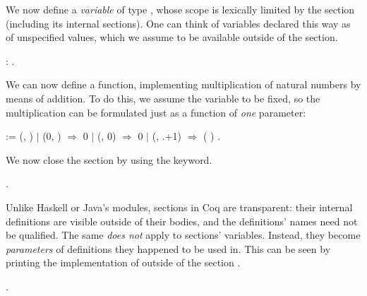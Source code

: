 We now define a \textit{variable}  of type , whose scope is lexically
limited by the section  (including its internal
sections). One can think of variables declared this way as of
unspecified values, which we assume to be available outside of the
section.


\begin{coqdoccode}
\coqdocemptyline
\coqdocnoindent
{} : .\coqdoceol
\coqdocemptyline
\end{coqdoccode}


We can now define a function, implementing multiplication of natural
numbers by means of addition. To do this, we assume the variable 
to be fixed, so the multiplication can be formulated just as a
function of \textit{one} parameter:


\begin{coqdoccode}
\coqdocemptyline
\coqdocnoindent
{}   :=  (, ) \coqdoceol
\coqdocindent{0.50em}
\ensuremath{|} (0, \coqdocvar{\_}) \ensuremath{\Rightarrow} 0\coqdoceol
\coqdocindent{0.50em}
\ensuremath{|} (\coqdocvar{\_}, 0) \ensuremath{\Rightarrow} 0\coqdoceol
\coqdocindent{0.50em}
\ensuremath{|} (\coqdocvar{\_}, .+1) \ensuremath{\Rightarrow}  ( ) \coqdoceol
\coqdocindent{0.50em}
.\coqdoceol
\coqdocemptyline
\end{coqdoccode}


We now close the section by using the   keyword.


\begin{coqdoccode}
\coqdocemptyline
\coqdocnoindent
{} .\coqdoceol
\coqdocemptyline
\end{coqdoccode}


Unlike Haskell or Java's modules, sections in Coq are transparent:
their internal definitions are visible outside of their bodies, and
the definitions' names need not be qualified. The same \textit{does not}
apply to sections' variables. Instead, they become \textit{parameters} of
definitions they happened to be used in. This can be seen by printing
the implementation of  outside of the section
.


\begin{coqdoccode}
\coqdocemptyline
\coqdocnoindent
{} .\coqdoceol
\coqdocemptyline
\end{coqdoccode}


